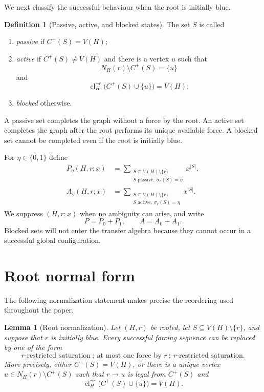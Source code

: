 \documentclass[11pt,reqno]{amsart}
\newtheorem{lemma}[lemma]{Lemma}
\theoremstyle{definition}
\newtheorem{definition}[definition]{Definition}
\newcommand{\cl}{\operatorname{cl}}
\begin{document}
We next classify the successful behaviour when the root is initially blue.

\begin{definition}[Passive, active, and blocked states]\label{def:states}
The set $S$ is called
\begin{enumerate}[label=\textnormal{(\roman*)}]
\item \emph{passive} if $C^+(S)=V(H)$;
\item \emph{active} if $C^+(S)\ne V(H)$ and there is a vertex $u$ such that
  \[
    N_H(r)\setminus C^+(S)=\{u\}
  \]
  and
  \[
    \cl_H^{\neg r}\bigl(C^+(S)\cup\{u\}\bigr)=V(H);
  \]
\item \emph{blocked} otherwise.
\end{enumerate}
\end{definition}

A passive set completes the graph without a force by the root.  An active set completes the graph after the root performs its unique available force.  A blocked set cannot be completed even if the root is initially blue.

For $\eta\in\{0,1\}$ define
\begin{align*}
  P_\eta(H,r;x)
  &=\sum_{\substack{S\subseteq V(H)\setminus\{r\}\\
                     S\text{ passive},\ \sigma_r(S)=\eta}}
      x^{|S|},\\
  A_\eta(H,r;x)
  &=\sum_{\substack{S\subseteq V(H)\setminus\{r\}\\
                     S\text{ active},\ \sigma_r(S)=\eta}}
      x^{|S|}.
\end{align*}
We suppress $(H,r;x)$ when no ambiguity can arise, and write
\[
  P=P_0+P_1,
  \qquad
  A=A_0+A_1.
\]
Blocked sets will not enter the transfer algebra because they cannot occur in a successful global configuration.

\section{Root normal form}\label{sec:normal-form}

The following normalization statement makes precise the reordering used
throughout the paper.

\begin{lemma}[Root normalization]\label{lem:root-normalization}
Let $(H,r)$ be rooted, let $S\subseteq V(H)\setminus\{r\}$, and suppose that
$r$ is initially blue.  Every successful forcing sequence can be replaced by
one of the form
\[
  \text{$r$-restricted saturation}
  \ ;\ 
  \text{at most one force by $r$}
  \ ;\ 
  \text{$r$-restricted saturation}.
\]
More precisely, either $C^+(S)=V(H)$, or there is a unique vertex
$u\in N_H(r)\setminus C^+(S)$ such that $r\to u$ is legal from $C^+(S)$ and
\[
  \cl_H^{\neg r}\bigl(C^+(S)\cup\{u\}\bigr)=V(H).
\]
\end{lemma}
\end{document}
